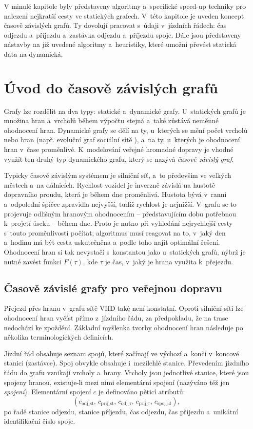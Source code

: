 V minulé kapitole byly představeny algoritmy a~specifické speed-up techniky pro nalezení nejkratší cesty ve statických grafech. V~této kapitole je uveden koncept časově závislých grafů. Ty dovolují pracovat s~údaji v~jízdních řádech: čas odjezdu a~příjezdu a~zastávka odjezdu a~příjezdu spoje. Dále jsou představeny nástavby na již uvedené algoritmy a~heuristiky, které umožní převést statická data na dynamická.

\section{Úvod do časově závislých grafů}

Grafy lze rozdělit na dva typy: statické a~dynamické grafy. U~statických grafů je množina hran a~vrcholů během výpočtu stejná a~také zůstává neměnné ohodnocení hran. Dynamické grafy se dělí na ty, u~kterých se mění počet vrcholů nebo hran (např. evoluční graf sociální sítě \cite{tejaDynamic}), a~na ty, u~kterých je ohodnocení hran v~čase proměnlivé. K~modelování veřejné hromadné dopravy je vhodné využít ten druhý typ dynamického grafu, který se nazývá \textit{časově závislý graf}.

Typicky časově závislým systémem je silniční síť, a~to především ve velkých městech a~na dálnicích. Rychlost vozidel je inverzně závislá na hustotě dopravního proudu, která je během dne proměnlivá. Hustota bývá v~ranní a~odpolední špičce zpravidla nejvyšší, tudíž rychlost je nejnižší. V~grafu se to projevuje odlišným hranovým ohodnocením – představujícím dobu potřebnou k~projetí úseku – během dne. Proto je nutno při vyhledání nejrychlejší cesty s~touto proměnlivostí počítat; algoritmus musí reagovat na to, v~jaký den a~hodinu má být cesta uskutečněna a~podle toho najít optimální řešení. Ohodnocení hran si tak nevystačí s~konstantou jako u~statických grafů, nýbrž je nutné zavést funkci $F(\tau)$, kde $\tau$ je čas, v~jaký je hrana využita k~přejezdu. 

\subsection{Časově závislé grafy pro veřejnou dopravu}
\label{casoveZavGrafy}
Přejezd přes hranu v~grafu sítě VHD také není konstatní. Oproti silniční síti lze ohodnocení hran vyčíst přímo z~jízdního řádu, za předpokladu, že na trase nedochází ke zpoždění. Základní myšlenka tvorby ohodnocení hran následuje po několika terminologických definicích.

Jízdní řád obsahuje seznam spojů, které začínají ve výchozí a~končí v~koncové stanici (zastávce). Spoj obvykle obsahuje i~mezilehlé stanice. Převedením jízdního řádu do grafu vznikají vrcholy a~hrany. Vrcholy jsou jednotlivé stanice, které jsou spojeny hranou, existuje-li mezi nimi elementární spojení (nazýváno též jen \textit{spojení}). Elementární spojení $c$ je definováno pěticí atributů:
\[
(c_{\text{odj\_st}},\, c_{\text{prij\_st}},\, c_{\text{odj\_}\tau},\, c_{\text{prij\_}\tau},\, c_{\text{spoj\_id}}),
\]
po řadě stanice odjezdu, stanice příjezdu, čas odjezdu, čas příjezdu a~unikátní identifikační číslo spoje.

